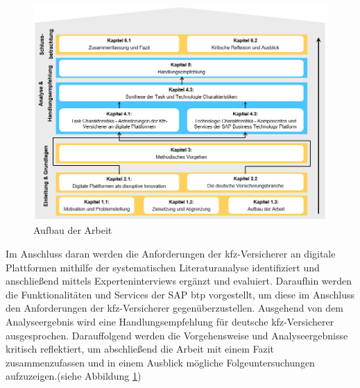 \begin{figure}[h]
    \centering
    \includegraphics[width=1\textwidth]{img/Aufbau_der_Arbeit2.jpg}
    \caption[Aufbau der Arbeit]{Aufbau der Arbeit\autocite{Aufbau}}
    \label{fig:Aufbau}
\end{figure}

Im Anschluss daran werden die Anforderungen der \ac{kfz}-Versicherer an digitale Plattformen mithilfe der systematischen Literaturanalyse identifiziert und anschließend mittels Experteninterviews ergänzt und evaluiert. Daraufhin werden die Funktionalitäten und Services der SAP \ac{btp} vorgestellt, um diese im Anschluss den Anforderungen der \ac{kfz}-Versicherer gegenüberzustellen. Ausgehend von dem Analyseergebnis wird eine Handlungsempfehlung für deutsche \ac{kfz}-Versicherer ausgesprochen. Darauffolgend werden die Vorgehensweise und Analyseergebnisse kritisch reflektiert, um abschließend die Arbeit mit einem Fazit zusammenzufassen und in einem Ausblick mögliche Folgeuntersuchungen aufzuzeigen.(siehe Abbildung \ref{fig:Aufbau})




\newpage